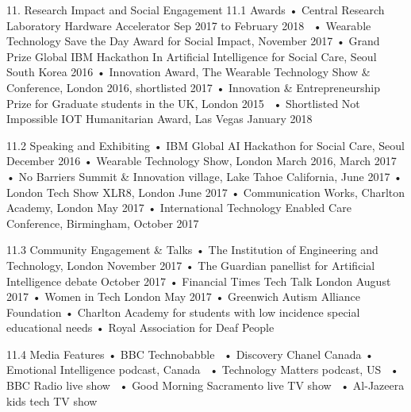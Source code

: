 11. Research Impact and Social Engagement 
11.1 Awards 
•	Central Research Laboratory Hardware Accelerator Sep 2017 to February 2018 
•	Wearable Technology Save the Day Award for Social Impact, November 2017
•	Grand Prize Global IBM Hackathon In Artificial Intelligence for Social Care, Seoul South Korea 2016
•	Innovation Award, The Wearable Technology Show & Conference, London 2016, shortlisted 2017
•	Innovation & Entrepreneurship Prize for Graduate students in the UK, London 2015 
•	Shortlisted Not Impossible IOT Humanitarian Award, Las Vegas January 2018

11.2 Speaking and Exhibiting 
•	IBM Global AI Hackathon for Social Care, Seoul December 2016
•	Wearable Technology Show, London March 2016, March 2017
•	No Barriers Summit & Innovation village, Lake Tahoe California, June 2017
•	London Tech Show XLR8, London June 2017
•	Communication Works, Charlton Academy, London May 2017
•	International Technology Enabled Care Conference, Birmingham, October 2017 

11.3 Community Engagement & Talks
•	The Institution of Engineering and Technology, London November 2017
•	The Guardian panellist for Artificial Intelligence debate October 2017
•	Financial Times Tech Talk London August 2017
•	Women in Tech London May 2017
•	Greenwich Autism Alliance Foundation 
•	Charlton Academy for students with low incidence special educational needs
•	Royal Association for Deaf People 

11.4 Media Features
•	BBC Technobabble 
•	Discovery Chanel Canada 
•	Emotional Intelligence podcast, Canada 
•	Technology Matters podcast, US 
•	BBC Radio live show 
•	Good Morning Sacramento live TV show 
•	Al-Jazeera kids tech TV show

